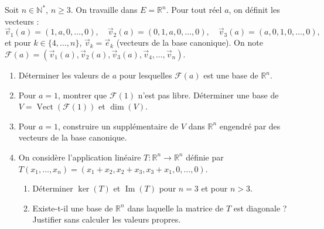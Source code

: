 \documentclass[11pt]{article}
\begin{document}
\begin{exercice}
Soit $n \in \mathbb{N}^*$, $n \ge 3$. On travaille dans $E = \mathbb{R}^n$.
Pour tout réel $a$, on définit les vecteurs :
\[
\vec{v}_1(a) = (1, a, 0, \dots, 0),\quad
\vec{v}_2(a) = (0, 1, a, 0, \dots, 0),\quad
\vec{v}_3(a) = (a, 0, 1, 0, \dots, 0),
\]
et pour $k \in \{4, \dots, n\}$, $\vec{v}_k = \vec{e}_k$ (vecteurs de la base canonique).
On note $\mathcal{F}(a) = (\vec{v}_1(a), \vec{v}_2(a), \vec{v}_3(a), \vec{v}_4, \dots, \vec{v}_n)$.

\begin{enumerate}
    \item Déterminer les valeurs de $a$ pour lesquelles $\mathcal{F}(a)$ est une base de $\mathbb{R}^n$.
    \item Pour $a = 1$, montrer que $\mathcal{F}(1)$ n'est pas libre. Déterminer une base de $V = \operatorname{Vect}(\mathcal{F}(1))$ et $\dim(V)$.
    \item Pour $a = 1$, construire un supplémentaire de $V$ dans $\mathbb{R}^n$ engendré par des vecteurs de la base canonique.
    \item On considère l'application linéaire $T : \mathbb{R}^n \to \mathbb{R}^n$ définie par $T(x_1, \dots, x_n) = (x_1 + x_2, x_2 + x_3, x_3 + x_1, 0, \dots, 0)$.
    \begin{enumerate}
        \item Déterminer $\ker(T)$ et $\operatorname{Im}(T)$ pour $n=3$ et pour $n>3$.
        \item Existe-t-il une base de $\mathbb{R}^n$ dans laquelle la matrice de $T$ est diagonale ? Justifier sans calculer les valeurs propres.
    \end{enumerate}
\end{enumerate}
\end{exercice}
\end{document}
